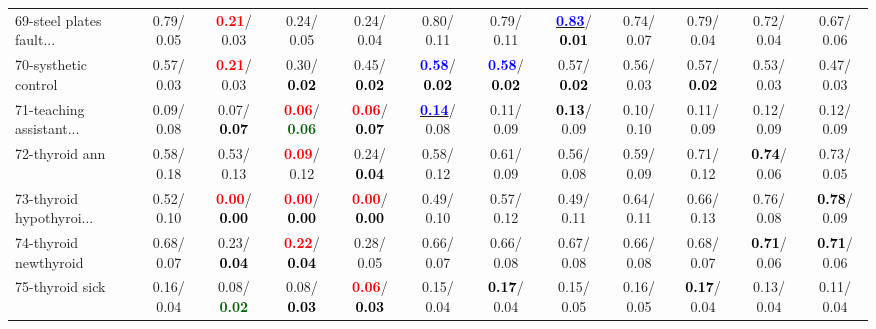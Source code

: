 \begin{table}[h]
\begin{center}
{\begin{tabular}{lc|c|c|c|c|c|c|c|c|c|c}
69-steel plates fault... &   0.79/  0.05 & \textcolor{red}{\textbf{  0.21}}/  0.03 &   0.24/  0.05 &   0.24/  0.04 &   0.80/  0.11 &   0.79/  0.11 & \underline{\textcolor{blue}{\textbf{  0.83}}}/\textcolor{black}{\textbf{  0.01}} &   0.74/  0.07 &   0.79/  0.04 &   0.72/  0.04 &   0.67/  0.06 \\
70-systhetic control &   0.57/  0.03 & \textcolor{red}{\textbf{  0.21}}/  0.03 &   0.30/\textcolor{black}{\textbf{  0.02}} &   0.45/\textcolor{black}{\textbf{  0.02}} & \textcolor{blue}{\textbf{  0.58}}/\textcolor{black}{\textbf{  0.02}} & \textcolor{blue}{\textbf{  0.58}}/\textcolor{black}{\textbf{  0.02}} &   0.57/\textcolor{black}{\textbf{  0.02}} &   0.56/  0.03 &   0.57/\textcolor{black}{\textbf{  0.02}} &   0.53/  0.03 &   0.47/  0.03 \\
71-teaching assistant... &   0.09/  0.08 &   0.07/\textcolor{black}{\textbf{  0.07}} & \textcolor{red}{\textbf{  0.06}}/\textcolor{darkgreen}{\textbf{  0.06}} & \textcolor{red}{\textbf{  0.06}}/\textcolor{black}{\textbf{  0.07}} & \underline{\textcolor{blue}{\textbf{  0.14}}}/  0.08 &   0.11/  0.09 & \textcolor{black}{\textbf{  0.13}}/  0.09 &   0.10/  0.10 &   0.11/  0.09 &   0.12/  0.09 &   0.12/  0.09 \\ \hline
72-thyroid ann &   0.58/  0.18 &   0.53/  0.13 & \textcolor{red}{\textbf{  0.09}}/  0.12 &   0.24/\textcolor{black}{\textbf{  0.04}} &   0.58/  0.12 &   0.61/  0.09 &   0.56/  0.08 &   0.59/  0.09 &   0.71/  0.12 & \textcolor{black}{\textbf{  0.74}}/  0.06 &   0.73/  0.05 \\
73-thyroid hypothyroi... &   0.52/  0.10 & \textcolor{red}{\textbf{  0.00}}/\textcolor{black}{\textbf{  0.00}} & \textcolor{red}{\textbf{  0.00}}/\textcolor{black}{\textbf{  0.00}} & \textcolor{red}{\textbf{  0.00}}/\textcolor{black}{\textbf{  0.00}} &   0.49/  0.10 &   0.57/  0.12 &   0.49/  0.11 &   0.64/  0.11 &   0.66/  0.13 &   0.76/  0.08 & \textcolor{black}{\textbf{  0.78}}/  0.09 \\
74-thyroid newthyroid &   0.68/  0.07 &   0.23/\textcolor{black}{\textbf{  0.04}} & \textcolor{red}{\textbf{  0.22}}/\textcolor{black}{\textbf{  0.04}} &   0.28/  0.05 &   0.66/  0.07 &   0.66/  0.08 &   0.67/  0.08 &   0.66/  0.08 &   0.68/  0.07 & \textcolor{black}{\textbf{  0.71}}/  0.06 & \textcolor{black}{\textbf{  0.71}}/  0.06 \\
75-thyroid sick &   0.16/  0.04 &   0.08/\textcolor{darkgreen}{\textbf{  0.02}} &   0.08/\textcolor{black}{\textbf{  0.03}} & \textcolor{red}{\textbf{  0.06}}/\textcolor{black}{\textbf{  0.03}} &   0.15/  0.04 & \textcolor{black}{\textbf{  0.17}}/  0.04 &   0.15/  0.05 &   0.16/  0.05 & \textcolor{black}{\textbf{  0.17}}/  0.04 &   0.13/  0.04 &   0.11/  0.04 \\

\end{tabular}}
\end{center}
\end{table}
